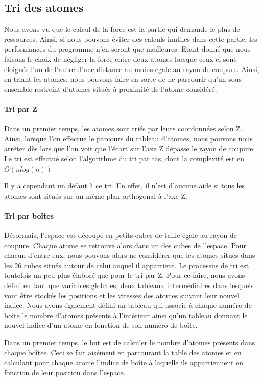 \subsection{Tri des atomes}
Nous avons vu que le calcul de la force est la partie qui demande le plus de ressources. Ainsi, si nous pouvons éviter des calculs inutiles dans cette partie, les performances du programme n'en seront que meilleures.
Etant donné que nous faisons le choix de négliger la force entre deux atomes lorsque ceux-ci sont éloignés l'un de l'autre d'une distance au moins égale au rayon de coupure. Ainsi, en triant les atomes, nous pouvons faire en sorte de ne parcourir qu'un sous-ensemble restreint d'atomes situés à proximité de l'atome considéré.

\paragraph{Tri par Z}
Dans un premier temps, les atomes sont triés par leurs coordonnées selon Z. Ainsi, lorsque l'on effectue le parcours du tableau d'atomes, nous pouvons nous arrêter dès lors que l'on voit que l'écart sur l'axe Z dépasse le rayon de coupure.
Le tri est effectué selon l'algorithme du tri par tas, dont la complexité est en $O(n log(n))$

Il y a cependant un défaut à ce tri. En effet, il n'est d'aucune aide si tous les atomes sont situés sur un même plan orthogonal à l'axe Z.

\paragraph{Tri par boîtes}
Désormais, l'espace est découpé en petits cubes de taille égale au rayon de coupure. Chaque atome se retrouve alors dans un des cubes de l'espace. Pour chacun d'entre eux, nous pouvons alors ne considérer que les atomes situés dans les 26 cubes situés autour de celui auquel il appartient.
Le processus de tri est toutefois un peu plus élaboré que pour le tri par Z. Pour ce faire, nous avons défini en tant que variables globales, deux tableaux intermédiaires dans lesquels vont être stockés les positions et les vitesses des atomes suivant leur nouvel indice. Nous avons également défini un tableau qui associe à chaque numéro de boîte le nombre d'atomes présents à l'intérieur ainsi qu'un tableau donnant le nouvel indice d'un atome en fonction de son numéro de boîte.

Dans un premier temps, le but est de calculer le nombre d'atomes présents dans chaque boîtes. Ceci se fait aisément en parcourant la table des atomes et en calculant pour chaque atome l'indice de boîte à laquelle ils appartiennent en fonction de leur position dans l'espace.

